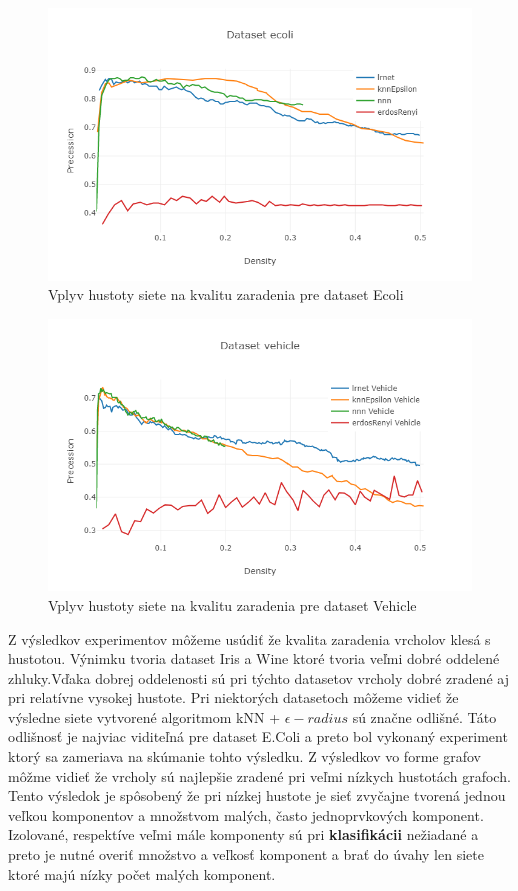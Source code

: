 \documentclass[slovak,master,dept460,male,cpp,cpdeclaration]{diploma}
\begin{document}
\begin{figure}[H]
\label{plot_ecoli_base}
\centering
    \includegraphics[width=\textwidth]{Plots/plot_ecoli_base.png}
    \caption{Vplyv hustoty siete na kvalitu zaradenia pre dataset Ecoli}
\end{figure} 

\begin{figure}[H]
\centering
    \includegraphics[width=\textwidth]{Plots/plot_vehicle_base.png}
    \caption{Vplyv hustoty siete na kvalitu zaradenia pre dataset Vehicle}
\end{figure} 

Z výsledkov experimentov môžeme usúdiť že kvalita zaradenia vrcholov klesá s hustotou. Výnimku tvoria dataset Iris a Wine ktoré tvoria veľmi dobré oddelené zhluky.Vďaka dobrej oddelenosti sú pri týchto datasetov vrcholy dobré zradené aj pri relatívne vysokej hustote. Pri niektorých datasetoch môžeme vidieť že výsledne siete vytvorené algoritmom kNN + $\epsilon-radius$ sú značne odlišné. Táto odlišnosť je najviac viditeľná pre dataset E.Coli a preto bol vykonaný experiment ktorý sa zameriava na skúmanie tohto výsledku. Z výsledkov vo forme grafov môžme vidieť že vrcholy sú najlepšie zradené pri veľmi nízkych hustotách grafoch. Tento výsledok je spôsobený že pri nízkej hustote je sieť zvyčajne tvorená jednou veľkou komponentov a množstvom malých, často jednoprvkových komponent. Izolované, respektíve veľmi mále komponenty sú pri \textbf{klasifikácii} nežiadané a preto je nutné overiť množstvo a veľkosť komponent a brať do úvahy len siete ktoré majú nízky počet malých komponent.  
\end{document}
